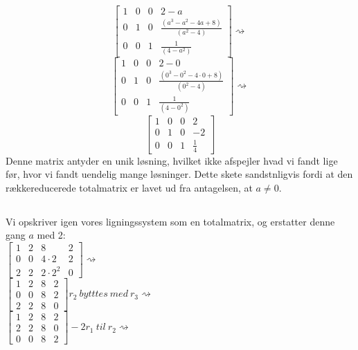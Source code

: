\documentclass[a4paper,12pt]{article}
\begin{document}
\[
\left[\begin{array}{ccc|c}
    1 & 0 & 0 & 2-a \\
    0 & 1 & 0 & \frac{(a^3 - a^2 - 4a + 8)}{(a^2 - 4)} \\
    0 & 0 & 1 & \frac{1}{(4-a^2)}
\end{array}\right]
\rightsquigarrow
\]
\[
\left[\begin{array}{ccc|c}
    1 & 0 & 0 & 2-0 \\
    0 & 1 & 0 & \frac{(0^3 - 0^2 - 4\cdot0 + 8)}{(0^2 - 4)} \\
    0 & 0 & 1 & \frac{1}{(4-0^2)}
\end{array}\right]
\rightsquigarrow
\]
\[
\left[\begin{array}{ccc|c}
    1 & 0 & 0 & 2 \\
    0 & 1 & 0 & -2 \\
    0 & 0 & 1 & \frac{1}{4}
\end{array}\right]
\]
Denne matrix antyder en unik løsning, hvilket ikke afspejler hvad vi fandt lige før, hvor vi fandt uendelig mange løsninger. Dette skete sandstnligvis fordi at den rækkereducerede totalmatrix er lavet ud fra antagelsen, at $a \neq 0$.

\subsection{}
Vi opskriver igen vores ligningssystem som en totalmatrix, og erstatter denne gang $a$ med 2:\\

$\left[\begin{array}{ccc|c}
    1 & 2 & 8 & 2 \\
    0 & 0 & 4\cdot2 & 2 \\
    2 & 2 & 2\cdot2^2 & 0
\end{array}\right]
\rightsquigarrow$\\

$\left[\begin{array}{ccc|c}
    1 & 2 & 8 & 2 \\
    0 & 0 & 8 & 2 \\
    2 & 2 & 8 & 0
\end{array}\right]
r_2 \ bytttes \ med \ r_3
\rightsquigarrow$\\

$\left[\begin{array}{ccc|c}
    1 & 2 & 8 & 2 \\
    2 & 2 & 8 & 0 \\
    0 & 0 & 8 & 2
\end{array}\right]
-2r_1 \ til \ r_2
\rightsquigarrow$\\
\end{document}
